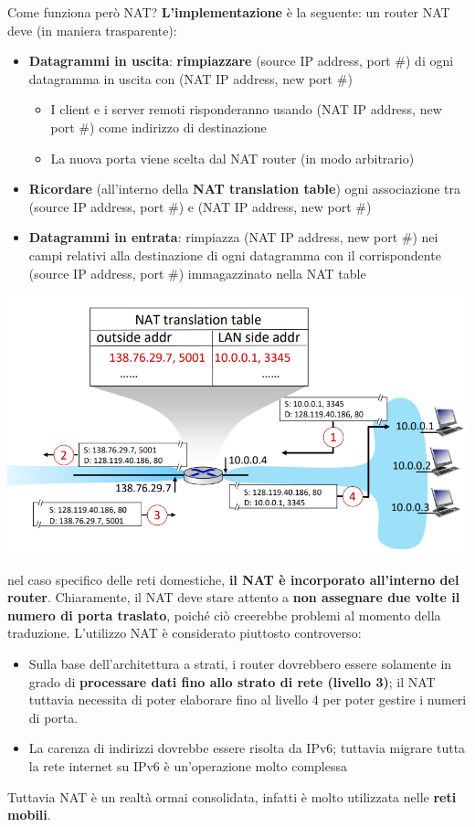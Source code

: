 \documentclass[12pt]{article}
\begin{document}
Come funziona però NAT? \textbf{L'implementazione} è la seguente: un router NAT deve (in maniera trasparente):
\begin{itemize}
    \item \textbf{Datagrammi in uscita}: \textbf{rimpiazzare} (source IP address, port \#) di ogni datagramma in uscita con (NAT IP address, new port \#)
    \begin{itemize}
        \item I client e i server remoti risponderanno usando (NAT IP address, new port \#) come indirizzo di destinazione
        \item La nuova porta viene scelta dal NAT router (in modo arbitrario)
    \end{itemize}
    \item \textbf{Ricordare} (all'interno della \textbf{NAT translation table}) ogni associazione tra (source IP address, port \#) e (NAT IP address, new port \#)
    \item \textbf{Datagrammi in entrata}: rimpiazza (NAT IP address, new port \#) nei campi relativi alla destinazione di ogni datagramma con il corrispondente (source IP address, port \#) immagazzinato nella NAT table
\end{itemize}
\begin{center}
    \includegraphics[width =1\linewidth]{Images/95.png}
\end{center}
nel caso specifico delle reti domestiche, \textbf{il NAT è incorporato all'interno del router}.
Chiaramente, il NAT deve stare attento a \textbf{non assegnare due volte il numero di porta traslato}, poiché ciò creerebbe problemi al momento della traduzione.
L'utilizzo NAT è considerato piuttosto controverso:
\begin{itemize}
    \item Sulla base dell'architettura a strati, i router dovrebbero essere solamente in grado di \textbf{processare dati fino allo strato di rete (livello 3)}; il NAT tuttavia necessita di poter elaborare fino al livello 4 per poter gestire i numeri di porta.
    \item La carenza di indirizzi dovrebbe essere risolta da IPv6; tuttavia migrare tutta la rete internet su IPv6 è un'operazione molto complessa
\end{itemize}
Tuttavia NAT è un realtà ormai consolidata, infatti è molto utilizzata nelle \textbf{reti mobili}.
\end{document}
